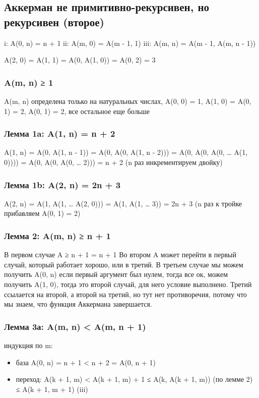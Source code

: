\documentclass[11pt]{article}
\begin{document}
\subsection{Аккерман не примитивно-рекурсивен, но рекурсивен (второе)}
\label{sec-10-3}
i:   A(0, n) = n + 1
ii:  A(m, 0) = A(m - 1, 1)
iii: A(m, n) = A(m - 1, A(m, n - 1))

A(2, 0) = A(1, 1) = A(0, A(1, 0)) = A(0, 2) = 3
\subsubsection{A(m, n) ≥ 1}
\label{sec-10-3-1}
A(m, n) определена только на натуральных числах,
A(0, 0) = 1, A(1, 0) = A(0, 1) = 2, A(0, 1) = 2,
все остальное еще больше
\subsubsection{Лемма 1a: A(1, n) = n + 2}
\label{sec-10-3-2}
A(1, n)
= A(0, A(1, n - 1))
= A(0, A(0, A(1, n - 2)))
= A(0, A(0, A(0, \ldots{} A(1, 0))))
= A(0, A(0, A(0, \ldots{} 2)))
= n + 2 (n раз инкрементируем двойку)
\subsubsection{Лемма 1b: A(2, n) = 2n + 3}
\label{sec-10-3-3}
A(2, n)
= A(1, A(1, \ldots{} A(2, 0)))
= A(1, A(1, \ldots{} 3))
= 2n + 3 (n раз к тройке прибавляем A(0, 1) = 2)
\subsubsection{Лемма 2: A(m, n) ≥ n + 1}
\label{sec-10-3-4}
В первом случае A ≥ n + 1 = n + 1
Во втором A может перейти в первый случай, который работает
хорошо, или в третий.
В третьем случае мы можем получить A(0, n) если первый аргумент
был нулем, тогда все ок, можем получить A(1, 0), тогда это второй
случай, для него условие выполнено.
Третий ссылается на второй, а второй на третий, но тут
нет противоречия, потому что мы знаем, что функция Аккермана
завершается.
\subsubsection{Лемма 3а: A(m, n) < A(m, n + 1)}
\label{sec-10-3-5}
индукция по m:
\begin{itemize}
\item база
A(0, n) = n + 1 < n + 2 = A(0, n + 1)
\item переход:
A(k + 1, m) < A(k + 1, m) + 1
≤ A(k, A(k + 1, m)) (по лемме 2)
≤ A(k + 1, m + 1)   (iii)
\end{itemize}
\end{document}
